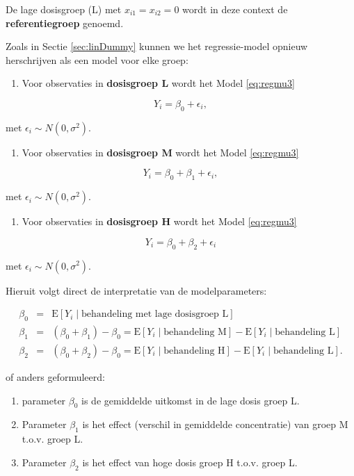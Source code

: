 \documentclass[
  12pt,dutch,coursenotes]{book}
\providecommand{\tightlist}{%
  \setlength{\itemsep}{0pt}\setlength{\parskip}{0pt}}
\begin{document}
De lage dosisgroep (L) met \(x_{i1}=x_{i2}=0\) wordt in deze context de \textbf{referentiegroep} genoemd.

Zoals in Sectie \ref{sec:linDummy} kunnen we het regressie-model opnieuw herschrijven als een model voor elke groep:

\begin{enumerate}
\def\labelenumi{\arabic{enumi}.}
\tightlist
\item
  Voor observaties in \textbf{dosisgroep L} wordt het Model \eqref{eq:regmu3}
\end{enumerate}

\[Y_i = \beta_0+\epsilon_i,\]

met \(\epsilon_i \sim N(0,\sigma^2)\).

\begin{enumerate}
\def\labelenumi{\arabic{enumi}.}
\setcounter{enumi}{1}
\tightlist
\item
  Voor observaties in \textbf{dosisgroep M} wordt het Model \eqref{eq:regmu3}
\end{enumerate}

\[Y_i = \beta_0+\beta_1 + \epsilon_i,\]

met \(\epsilon_i \sim N(0,\sigma^2)\).

\begin{enumerate}
\def\labelenumi{\arabic{enumi}.}
\setcounter{enumi}{2}
\tightlist
\item
  Voor observaties in \textbf{dosisgroep H} wordt het Model \eqref{eq:regmu3}
\end{enumerate}

\[Y_i = \beta_0+\beta_2 + \epsilon_i\]

met \(\epsilon_i \sim N(0,\sigma^2)\).

Hieruit volgt direct de interpretatie van de modelparameters:

\begin{eqnarray*}
   \beta_0 &=&  \text{E}\left[Y_i \mid \text{behandeling met lage dosisgroep L}\right] \\
   \beta_1 &=&  (\beta_0+\beta_1)-\beta_0 = \text{E}\left[Y_i \mid \text{behandeling M}\right] - \text{E}\left[Y_i \mid \text{behandeling L}\right] \\
   \beta_2 &=&  (\beta_0+\beta_2)-\beta_0 = \text{E}\left[Y_i \mid \text{behandeling H}\right]-\text{E}\left[Y_i \mid \text{behandeling L}\right].
\end{eqnarray*}

of anders geformuleerd:

\begin{enumerate}
\def\labelenumi{\arabic{enumi}.}
\tightlist
\item
  parameter \(\beta_0\) is de gemiddelde uitkomst in de lage dosis groep L.
\item
  Parameter \(\beta_1\) is het effect (verschil in gemiddelde concentratie) van groep M t.o.v. groep L.
\item
  Parameter \(\beta_2\) is het effect van hoge dosis groep H t.o.v. groep L.
\end{enumerate}
\end{document}
